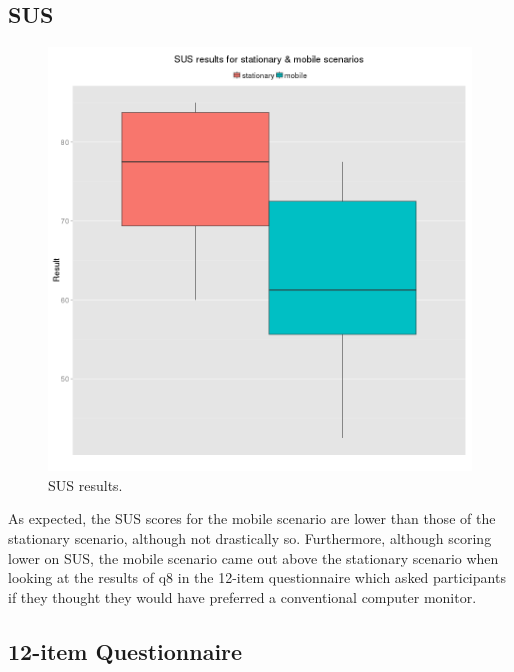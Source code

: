 \documentclass[oneside]{book}
\begin{document}

\pagebreak

\subsection{SUS}

\begin{figure}[h]
	\begin{center}
		\includegraphics[width=0.7\linewidth]{images/sus.png}
		\caption{SUS results.}
		\label{sus}
	\end{center}
\end{figure}

As expected, the SUS scores for the mobile scenario are lower than those of the stationary scenario, although not drastically so. Furthermore, although scoring lower on SUS, the mobile scenario came out above the stationary scenario when looking at the results of q8 in the 12-item questionnaire which asked participants if they thought they would have preferred a conventional computer monitor.

\pagebreak

\subsection{12-item Questionnaire}
\end{document}
